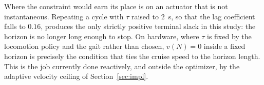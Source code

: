 \documentclass[11pt,a4paper]{article}
\newcommand{\dsafe}{d_{\mathrm{safe}}}
\begin{document}
Where the constraint would earn its place is on an actuator that is not instantaneous. Repeating a cycle
with $\tau$ raised to $2$~s, so that the lag coefficient falls to $0.16$, produces the only strictly positive
terminal slack in this study: the horizon is no longer long enough to stop. On hardware, where $\tau$ is fixed by the locomotion policy and the gait
rather than chosen, $v(N)=0$ inside a fixed horizon is precisely the condition that ties the cruise speed to
the horizon length. This is the job currently done reactively, and outside the optimizer, by the adaptive
velocity ceiling of Section~\ref{sec:impl}.





\end{document}
